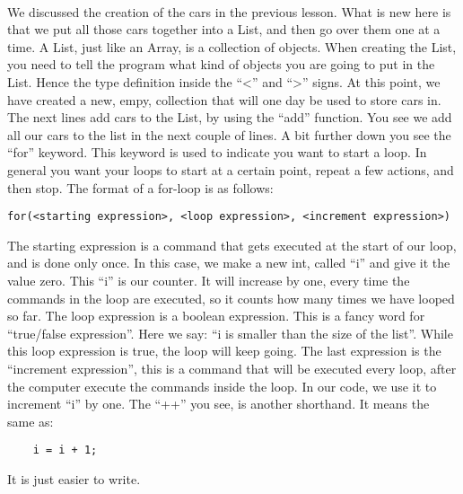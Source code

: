\documentclass[11pt,fleqn]{book} %
\begin{document}
\paragraph{}We discussed the creation of the cars in the previous lesson. What is new here is that we put all those cars together into a List, and then go over them one at a time. A List, just like an Array, is a collection of objects. When creating the List, you need to tell the program what kind of objects you are going to put in the List. Hence the type definition inside the ``<'' and ``>'' signs. At this point, we have created a new, empy, collection that will one day be used to store cars in.
The next lines add cars to the List, by using the ``add'' function. You see we add all our cars to the list in the next couple of lines. A bit further down you see the ``for'' keyword. This keyword is used to indicate you want to start a loop. In general you want your loops to start at a certain point, repeat a few actions, and then stop. The format of a for-loop is as follows:
\begin{verbatim}
for(<starting expression>, <loop expression>, <increment expression>)
\end{verbatim}
The starting expression is a command that gets executed at the start of our loop, and is done only once. In this case, we make a new int, called ``i'' and give it the value zero. This ``i'' is our counter. It will increase by one, every time the commands in the loop are executed, so it counts how many times we have looped so far.
The loop expression is a boolean expression. This is a fancy word for ``true/false expression''. Here we say: ``i is smaller than the size of the list''. While this loop expression is true, the loop will keep going. 
The last expression is the ``increment expression'', this is a command that will be executed every loop, after the computer execute the commands inside the loop. In our code, we use it to increment ``i'' by one. The ``++'' you see, is another shorthand. It means the same as:
\begin{lstlisting}
	i = i + 1;
\end{lstlisting}
It is just easier to write. 
\end{document}
